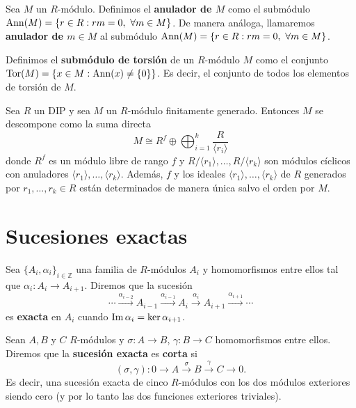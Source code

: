 \begin{definicion}
	Sea \(M\) un \(R\)-módulo. Definimos el \textbf{anulador de \(M\)} como el submódulo
	\(\ann(M) = \{r \in R : rm=0, \ \forall m \in M\}\). De manera análoga, llamaremos
	\textbf{anulador de \(m \in M\)} al submódulo
	\(\ann(M) = \{r \in R : rm=0, \ \forall m \in M\}\).
\end{definicion}

\begin{definicion}
	Definimos el \textbf{submódulo de torsión} de un \(R\)-módulo \(M\) como el
	conjunto \(\operatorname{Tor}(M)= \{x \in M : \operatorname{Ann}(x) \neq \{0\}\}\). Es decir, el conjunto de
	todos los elementos de torsión de \(M\).
\end{definicion}
\begin{teorema}
	 \label{teo:desc-cicl-prim} Sea \(R\) un DIP y sea
	\(M\) un \(R\)-módulo finitamente generado. Entonces \(M\) se descompone como la
	suma directa
	\[
	M \cong R^{f}\oplus \bigoplus_{i = 1}^{k}\frac{R}{\langle r_{i}\rangle}
	\]
	donde \(R^{f}\) es un módulo libre de rango \(f\) y
	\(R/\langle r_{1}\rangle, \ldots, R/\langle r_{k}\rangle\) son módulos cíclicos
	con anuladores \(\langle r_{1}\rangle, \ldots, \langle r_{k}\rangle\). Además,
	\(f\) y los ideales \(\langle r_{1}\rangle, \ldots, \langle r_{k}\rangle\) de \(R\)
	generados por \(r_{1}, \ldots, r_{k}\in R\) están determinados de manera única
	salvo el orden por \(M\).
\end{teorema}

\section{Sucesiones exactas}

\begin{definicion}
	Sea \(\{A_{i}, \alpha_{i}\}_{i \in \mathbb{Z}}\) una familia de \(R\)-módulos \(A_{i}\)
	y homomorfismos entre ellos tal que \(\alpha_{i}: A_{i}\rightarrow A_{i+1}\).
	Diremos que la sucesión
	\[
	\cdots \xrightarrow{\alpha_{i-2}}A_{i-1}\xrightarrow{\alpha_{i-1}}A_{i}\xrightarrow
	{\alpha_{i}}A_{i+1}\xrightarrow{\alpha_{i+1}}\cdots
	\]
	es \textbf{exacta} en \(A_{i}\) cuando \(\operatorname{Im} \alpha_{i}= \ker \alpha_{i+1}\).
\end{definicion}

\begin{definicion}
	Sean \(A,B\) y \(C\) \(R\)-módulos y \(\sigma: A \rightarrow B\),
	\(\gamma: B \rightarrow C\) homomorfismos entre ellos. Diremos que la \textbf{sucesión
		exacta} es \textbf{corta} si
	\[
	(\sigma, \gamma): 0 \rightarrow A \xrightarrow{\sigma}B \xrightarrow{\gamma}C
	\rightarrow 0.
	\]
	Es decir, una sucesión exacta de cinco \(R\)-módulos con los dos módulos
	exteriores siendo cero (y por lo tanto las dos funciones exteriores triviales).
\end{definicion}

